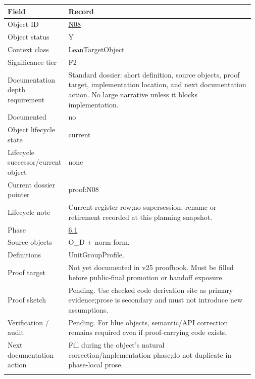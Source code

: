 \begin{longtable}{L{0.16\linewidth} L{0.81\linewidth}}
\hline
\textbf{Field} & \textbf{Record}\\
\hline
Object ID & \hyperlink{object-row-N08}{N08}\\
\hline\addlinespace[0.20em]
Object status & Y\\
\hline\addlinespace[0.20em]
Context class & LeanTargetObject\\
\hline\addlinespace[0.20em]
Significance tier & F2\\
\hline\addlinespace[0.20em]
Documentation depth requirement & Standard dossier: short definition, source objects, proof target, implementation location, and next documentation action. No large narrative unless it blocks implementation.\\
\hline\addlinespace[0.20em]
Documented & no\\
\hline\addlinespace[0.20em]
Object lifecycle state & current\\
\hline\addlinespace[0.20em]
Lifecycle successor/\allowbreak{}current object & none\\
\hline\addlinespace[0.20em]
Current dossier pointer & proof:N08\\
\hline\addlinespace[0.20em]
Lifecycle note & Current register row;\newline no supersession, rename or retirement recorded at this planning snapshot.\\
\hline\addlinespace[0.20em]
Phase & \hyperlink{phase-row-6-1}{6.1}\\
\hline\addlinespace[0.20em]
Source objects & O\_D + norm form.\\
\hline\addlinespace[0.20em]
Definitions & UnitGroupProfile.\\
\hline\addlinespace[0.20em]
Proof target & Not yet documented in v25 proofbook. Must be filled before public-final promotion or handoff exposure.\\
\hline\addlinespace[0.20em]
Proof sketch & Pending. Use checked code derivation site as primary evidence;\newline prose is secondary and must not introduce new assumptions.\\
\hline\addlinespace[0.20em]
Verification /\allowbreak{} audit & Pending. For blue objects, semantic/\allowbreak{}API correction remains required even if proof-carrying code exists.\\
\hline\addlinespace[0.20em]
Next documentation action & Fill during the object's natural correction/\allowbreak{}implementation phase;\newline do not duplicate in phase-local prose.\\
\hline\addlinespace[0.20em]
\end{longtable}
